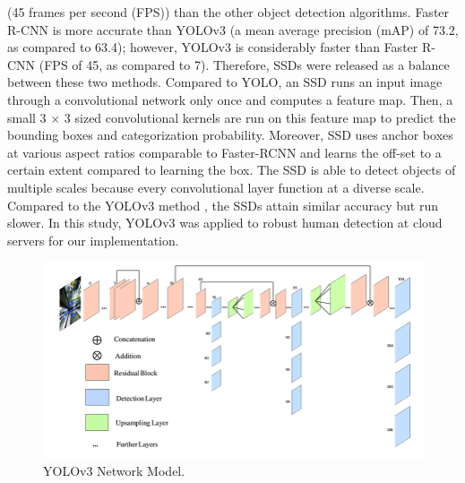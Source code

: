 (45 frames per second (FPS)) than the other object detection algorithms. Faster R-CNN is more accurate than YOLOv3 (a mean average precision (mAP) of 73.2, as compared to 63.4); however, YOLOv3 is considerably faster than Faster R-CNN (FPS of 45, as compared to 7). Therefore, SSDs  \cite{liu2016ssd} were released as a balance between these two methods. Compared to YOLO, an SSD runs an input image through a convolutional network only once and computes a feature map. Then, a small 3 × 3 sized convolutional kernels are run on this feature map to predict the bounding boxes and categorization probability. Moreover, SSD uses anchor boxes at various aspect ratios comparable to Faster-RCNN and learns the off-set to a certain extent compared to learning the box. The SSD is able to detect objects of multiple scales because every convolutional layer function at a diverse scale. Compared to the YOLOv3 method \cite{redmon2018yolov3}, the SSDs attain similar accuracy but run slower. In this study, YOLOv3 was applied to robust human detection at cloud servers for our implementation. 

\begin{figure}
\centering
 \includegraphics[width=1.0\linewidth]{Figures/yolov3.png}
 \caption{YOLOv3 Network Model.}
 \label{fig:yolov3}
\end{figure}
